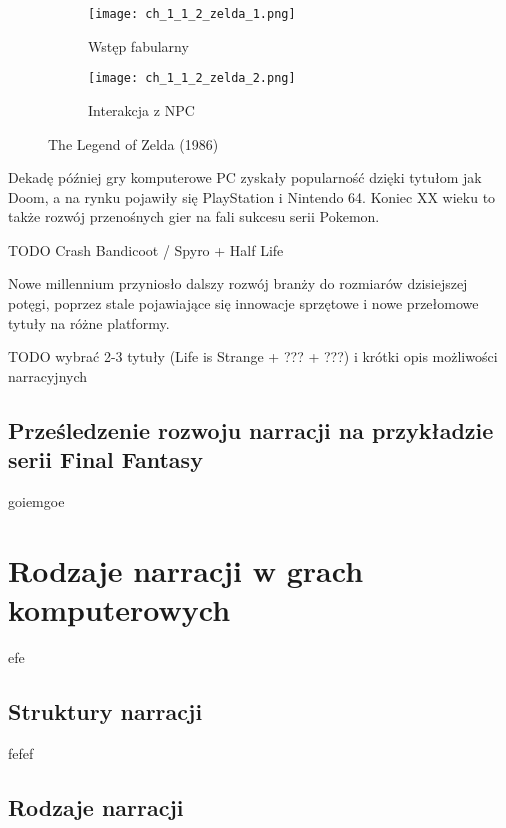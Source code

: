 \begin{figure}[h]
	\begin{subfigure}{0.49\textwidth}
		\caption{Wstęp fabularny}
		\texttt{[image: ch\_1\_1\_2\_zelda\_1.png]}
		\label{subfig:ch_1_1_2_zelda_1}
	\end{subfigure}
	\begin{subfigure}{0.49\textwidth}
		\caption{Interakcja z NPC}
		\texttt{[image: ch\_1\_1\_2\_zelda\_2.png]}
		\label{subfig:ch_1_1_2_zelda_2}
	\end{subfigure}
	\caption{The Legend of Zelda (1986)}
	\label{fig:ch1_1_2_zelda}
\end{figure}

Dekadę później gry komputerowe PC zyskały popularność dzięki tytułom jak Doom, a na rynku
pojawiły się PlayStation i Nintendo 64. Koniec XX wieku to także rozwój przenośnych gier na
fali sukcesu serii Pokemon.

TODO Crash Bandicoot / Spyro + Half Life

Nowe millennium przyniosło dalszy rozwój branży do rozmiarów dzisiejszej potęgi, poprzez stale
pojawiające się innowacje sprzętowe i nowe przełomowe tytuły na różne platformy.

TODO wybrać 2-3 tytuły (Life is Strange + ??? + ???) i krótki opis możliwości narracyjnych

\subsection{Prześledzenie rozwoju narracji na przykładzie serii Final Fantasy}\label{subsection:ch1_1_3}

goiemgoe

\section{Rodzaje narracji w grach komputerowych}\label{section:ch1_2}

efe

\subsection{Struktury narracji}\label{subsection:ch1_2_1}

fefef

\subsection{Rodzaje narracji}\label{subsection:ch1_2_2}

